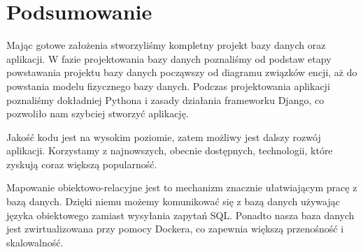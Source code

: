 \documentclass[12pt]{article}
\begin{document}
\newpage

\section{Podsumowanie}

Mając gotowe założenia stworzyliśmy kompletny projekt bazy danych oraz aplikacji. W fazie projektowania bazy danych poznaliśmy od podstaw etapy powstawania projektu bazy danych począwszy od diagramu związków encji, aż do powstania modelu fizycznego bazy danych. Podczas projektowania aplikacji poznaliśmy dokładniej Pythona i zasady działania frameworku Django, co pozwoliło nam szybciej stworzyć aplikację.

Jakość kodu jest na wysokim poziomie, zatem możliwy jest dalszy rozwój aplikacji. Korzystamy z najnowszych, obecnie dostępnych, technologii, które zyskują coraz
większą popularność.

Mapowanie obiektowo-relacyjne jest to mechanizm znacznie ułatwiającym pracę z bazą
danych. Dzięki niemu możemy komunikować się z bazą danych używając języka obiektowego zamiast wysyłania zapytań SQL. Ponadto nasza baza danych jest zwirtualizowana przy pomocy Dockera, co zapewnia większą przenośność i skalowalność.
\end{document}
